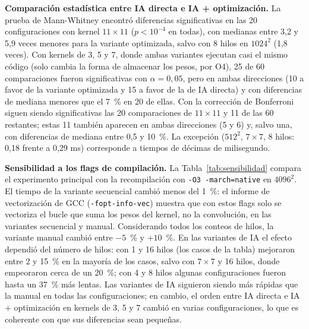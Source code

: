 \documentclass[12pt]{article}
\newcommand{\fuente}{\par\vspace{2pt}{\footnotesize Fuente: elaboración propia.}}
\begin{document}
\textbf{Comparación estadística entre IA directa e IA + optimización.} La prueba de Mann-Whitney encontró diferencias significativas en las 20 configuraciones con kernel $11\times11$ ($p < 10^{-4}$ en todas), con medianas entre 3,2 y 5,9 veces menores para la variante optimizada, salvo con 8 hilos en $1024^2$ (1,8 veces). Con kernels de 3, 5 y 7, donde ambas variantes ejecutan casi el mismo código (solo cambia la forma de almacenar los pesos, por O4), 25 de 60 comparaciones fueron significativas con $\alpha = 0{,}05$, pero en ambas direcciones (10 a favor de la variante optimizada y 15 a favor de la de IA directa) y con diferencias de mediana menores que el 7~\% en 20 de ellas. Con la corrección de Bonferroni siguen siendo significativas las 20 comparaciones de $11\times11$ y 11 de las 60 restantes; estas 11 también aparecen en ambas direcciones (5 y 6) y, salvo una, con diferencias de mediana entre 0,5 y 10~\%. La excepción ($512^2$, $7\times7$, 8 hilos: 0,18 frente a 0,29 ms) corresponde a tiempos de décimas de milisegundo.

\textbf{Sensibilidad a los flags de compilación.} La Tabla~\ref{tab:sensibilidad} compara el experimento principal con la recompilación con \texttt{-O3 -march=native} en $4096^2$. El tiempo de la variante secuencial cambió menos del 1~\%: el informe de vectorización de GCC (\texttt{-fopt-info-vec}) muestra que con estos flags solo se vectoriza el bucle que suma los pesos del kernel, no la convolución, en las variantes secuencial y manual. Considerando todos los conteos de hilos, la variante manual cambió entre $-5$~\% y $+10$~\%. En las variantes de IA el efecto dependió del número de hilos: con 1 y 16 hilos (los casos de la tabla) mejoraron entre 2 y 15~\% en la mayoría de los casos, salvo con $7\times7$ y 16 hilos, donde empeoraron cerca de un 20~\%; con 4 y 8 hilos algunas configuraciones fueron hasta un 37~\% más lentas. Las variantes de IA siguieron siendo más rápidas que la manual en todas las configuraciones; en cambio, el orden entre IA directa e IA + optimización en kernels de 3, 5 y 7 cambió en varias configuraciones, lo que es coherente con que sus diferencias sean pequeñas.

\begin{table}[H]
\centering
\caption{Sensibilidad a los flags de compilación en $4096^2$: tiempo medio con \texttt{-O2} (experimento principal) y con \texttt{-O3 -march=native}, y speedup $S_p$ correspondiente.}
\label{tab:sensibilidad}
\small

\fuente
\end{table}
\end{document}
